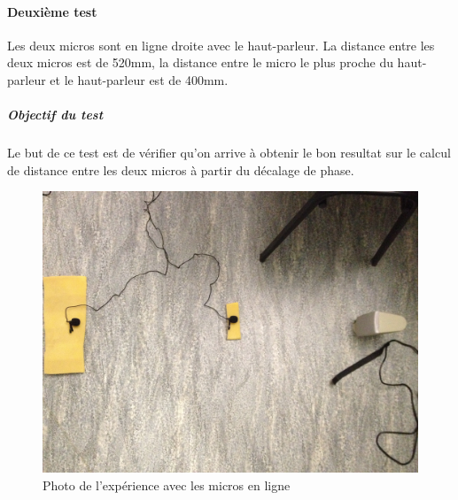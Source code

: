  \paragraph{Deuxième test} 
 Les deux micros sont en ligne droite avec le haut-parleur. La distance entre les deux micros est de 520mm, la distance entre le micro le plus proche du haut-parleur et le haut-parleur est de 400mm.
 \subparagraph{Objectif du test}
 Le but de ce test est de vérifier qu'on arrive à obtenir le bon resultat sur le calcul de distance entre les deux micros à partir du décalage de phase.
 \begin{figure}[H]
 \includegraphics[width=\textwidth]{../tests/lecture_de_signaux_carres/donnees11-03/test_2.jpg} 
 \caption{Photo de l'expérience avec les micros en ligne}
 \end{figure}
 	
